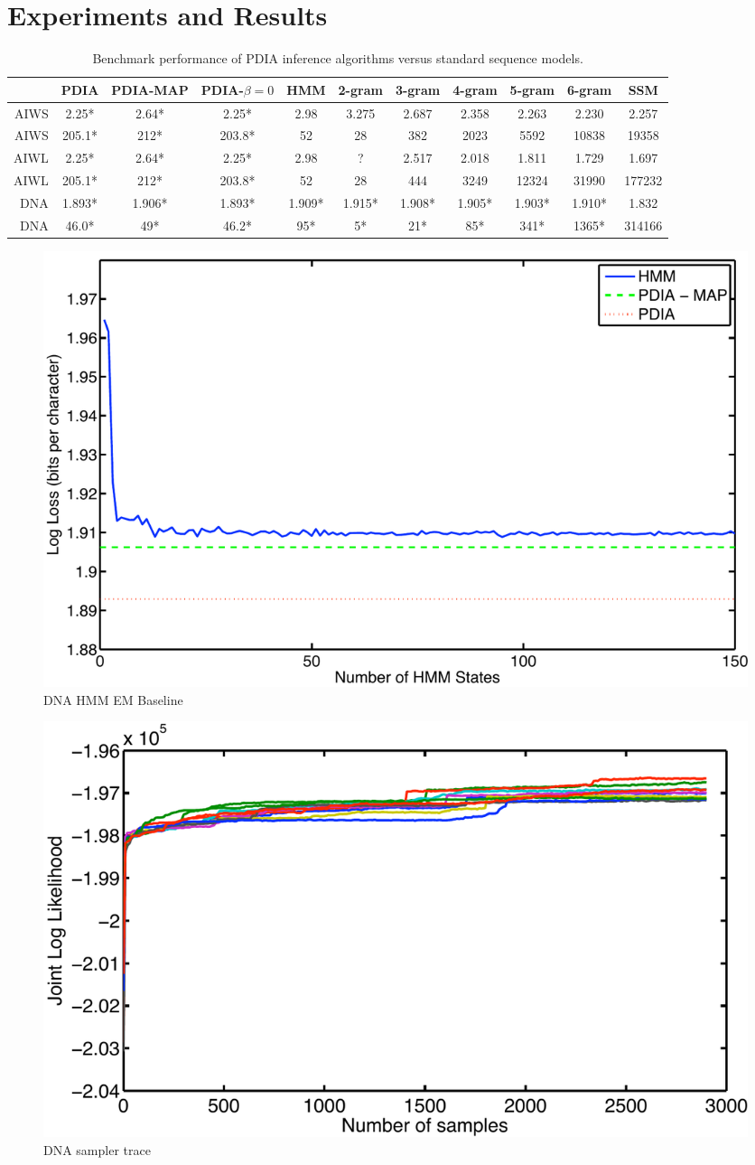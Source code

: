 \section{Experiments and Results}
\label{sec:results}

\begin{table}[t]
    \begin{center}
    \setlength{\tabcolsep}{1.3mm}
\begin{tabular}{r|cccccccccc}
\hline
& {\bf PDIA } & PDIA-MAP & PDIA-$\beta=0$ & HMM & 2-gram& 3-gram & 4-gram & 5-gram & 6-gram & SSM \\
\hline
AIWS & 2.25* & 2.64* & 2.25* & 2.98 & 3.275 & 2.687 & 2.358 & 2.263 & 2.230 & 2.257 \\
AIWS & 205.1* & 212* & 203.8* & 52 & 28 & 382 & 2023 & 5592 & 10838 & 19358 \\
\hline
\hline
AIWL & 2.25* & 2.64* & 2.25* & 2.98 & ? & 2.517 & 2.018 & 1.811 & 1.729 & 1.697 \\
AIWL & 205.1* & 212* & 203.8* & 52 & 28 & 444 & 3249 & 12324 & 31990 & 177232 \\
\hline
\hline
DNA & 1.893* & 1.906* & 1.893* & 1.909* & 1.915* & 1.908* & 1.905* & 1.903* & 1.910* & 1.832 \\
DNA & 46.0* & 49* & 46.2* & 95* & 5* & 21* & 85* & 341* & 1365* & 314166 \\
\hline
\end{tabular}
\end{center}
\caption[Short]{Benchmark performance of PDIA inference algorithms versus standard sequence models.}
\label{table:results}
\end{table}

\begin{figure}[htbp]
\begin{center}
\includegraphics[width=.5\textwidth]{results/dna_hmm}
\caption{DNA HMM EM Baseline}
\label{fig:dna_hmm}
\end{center}
\end{figure}

\begin{figure}[htbp]
\begin{center}
\includegraphics[width=.5\textwidth]{results/dna_sampler}
\caption{DNA sampler trace }
\label{fig:dna_sampler}
\end{center}
\end{figure}

